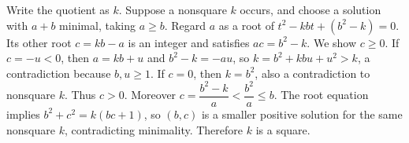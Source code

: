 Write the quotient as $k$. Suppose a nonsquare $k$ occurs, and choose a solution with $a+b$ minimal, taking $a\ge b$. Regard $a$ as a root of $t^2-kbt+(b^2-k)=0$. Its other root $c=kb-a$ is an integer and satisfies $ac=b^2-k$. We show $c\ge0$. If $c=-u<0$, then $a=kb+u$ and $b^2-k=-au$, so $k=b^2+kbu+u^2>k$, a contradiction because $b,u\ge1$. If $c=0$, then $k=b^2$, also a contradiction to nonsquare $k$. Thus $c>0$. Moreover $c=\dfrac{b^2-k}{a}<\dfrac{b^2}{a}\le b$. The root equation implies $b^2+c^2=k(bc+1)$, so $(b,c)$ is a smaller positive solution for the same nonsquare $k$, contradicting minimality. Therefore $k$ is a square.
